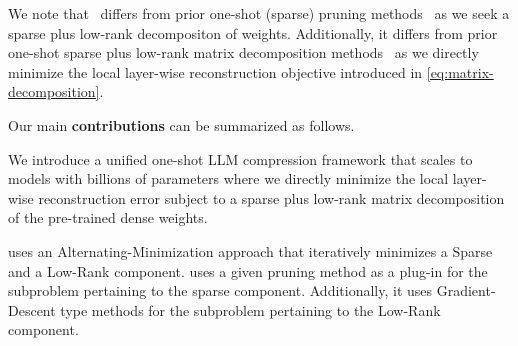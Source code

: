 We note that \ourframework~differs from prior one-shot (sparse) pruning methods~\cite{frantar2023sparsegpt, meng2024alps, benbaki2023fast} as we seek a sparse plus low-rank decompositon of weights.
Additionally, it differs from prior one-shot sparse plus low-rank matrix decomposition methods~\cite{zhang2024oats}
as we directly minimize the local layer-wise reconstruction objective introduced in \cref{eq:matrix-decomposition}.

Our main \textbf{contributions} can be summarized as follows.
\begin{compactitem}
    \item We introduce \ourframework a unified one-shot LLM compression framework that scales to models with billions of parameters where we directly minimize the local layer-wise reconstruction error subject to  a sparse plus low-rank matrix decomposition of the pre-trained dense weights. 

    
    \item \ourframework uses an Alternating-Minimization approach that iteratively minimizes a Sparse and a Low-Rank component. \ourframework uses a given pruning method as a plug-in for the subproblem pertaining to the sparse component. Additionally, it uses Gradient-Descent type methods for the subproblem pertaining to the Low-Rank component.
    
    
    

\end{compactitem}
